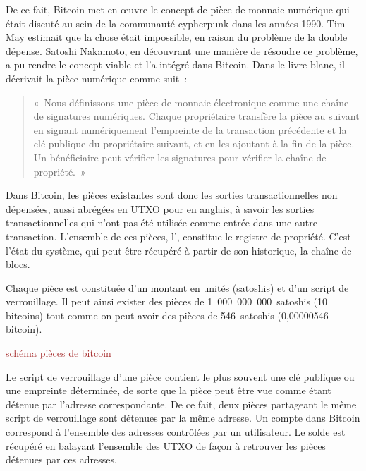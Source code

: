 De ce fait, Bitcoin met en œuvre le concept de pièce de monnaie numérique qui était discuté au sein de la communauté cypherpunk dans les années 1990. Tim May estimait que la chose était impossible, en raison du problème de la double dépense. Satoshi Nakamoto, en découvrant une manière de résoudre ce problème, a pu rendre le concept viable et l'a intégré dans Bitcoin. Dans le livre blanc, il décrivait la pièce numérique comme suit~:

\begin{quote}
«~Nous définissons une pièce de monnaie électronique comme une chaîne de signatures numériques. Chaque propriétaire transfère la pièce au suivant en signant numériquement l'empreinte de la transaction précédente et la clé publique du propriétaire suivant, et en les ajoutant à la fin de la pièce. Un bénéficiaire peut vérifier les signatures pour vérifier la chaîne de propriété.~»
\end{quote}

Dans Bitcoin, les pièces existantes sont donc les sorties transactionnelles non dépensées, aussi abrégées en UTXO pour  en anglais, à savoir les sorties transactionnelles qui n'ont pas été utilisée comme entrée dans une autre transaction. L'ensemble de ces pièces, l', constitue le registre de propriété. C'est l'état du système, qui peut être récupéré à partir de son historique, la chaîne de blocs.

Chaque pièce est constituée d'un montant en unités (satoshis) et d'un script de verrouillage. Il peut ainsi exister des pièces de 1~000~000~000~satoshis (10 bitcoins) tout comme on peut avoir des pièces de 546~satoshis (0,00000546 bitcoin).

\textcolor{brown}{schéma pièces de bitcoin}

Le script de verrouillage d'une pièce contient le plus souvent une clé publique ou une empreinte déterminée, de sorte que la pièce peut être vue comme étant détenue par l'adresse correspondante. De ce fait, deux pièces partageant le même script de verrouillage sont détenues par la même adresse. Un compte dans Bitcoin correspond à l'ensemble des adresses contrôlées par un utilisateur. Le solde est récupéré en balayant l'ensemble des UTXO de façon à retrouver les pièces détenues par ces adresses.

